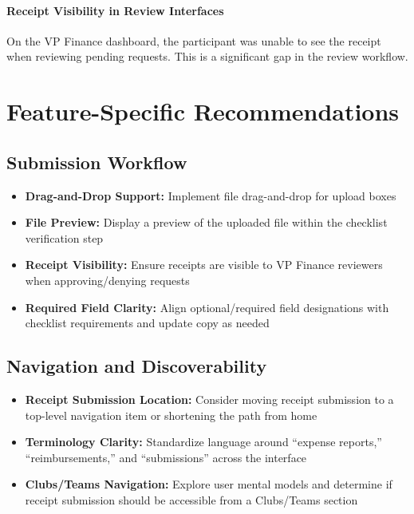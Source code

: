 \documentclass[12pt, titlepage]{article}
\begin{document}
\paragraph{Receipt Visibility in Review Interfaces}
On the VP Finance dashboard, the participant was unable to see the receipt when reviewing pending requests. This is a significant gap in the review workflow.

\section{Feature-Specific Recommendations}

\subsection{Submission Workflow}
\begin{itemize}
    \item \textbf{Drag-and-Drop Support:} Implement file drag-and-drop for upload boxes
    \item \textbf{File Preview:} Display a preview of the uploaded file within the checklist verification step
    \item \textbf{Receipt Visibility:} Ensure receipts are visible to VP Finance reviewers when approving/denying requests
    \item \textbf{Required Field Clarity:} Align optional/required field designations with checklist requirements and update copy as needed
\end{itemize}

\subsection{Navigation and Discoverability}
\begin{itemize}
    \item \textbf{Receipt Submission Location:} Consider moving receipt submission to a top-level navigation item or shortening the path from home
    \item \textbf{Terminology Clarity:} Standardize language around ``expense reports,'' ``reimbursements,'' and ``submissions'' across the interface
    \item \textbf{Clubs/Teams Navigation:} Explore user mental models and determine if receipt submission should be accessible from a Clubs/Teams section
\end{itemize}
\end{document}
